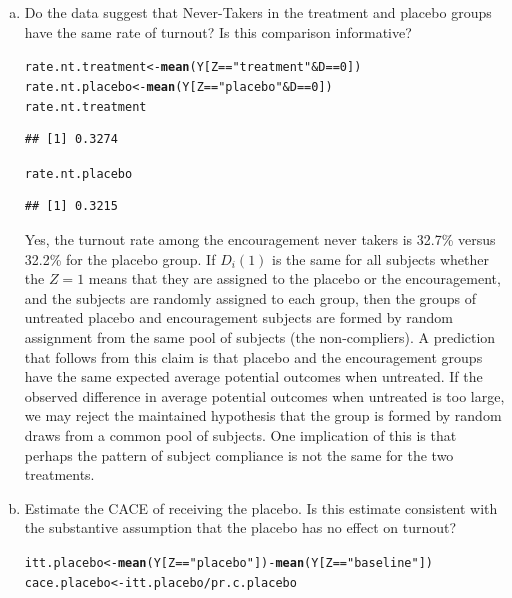 \documentclass[11pt,notitlepage]{article}\usepackage[]{graphicx}\usepackage[]{color}
\makeatletter
\newcommand{\hlnum}[1]{\textcolor[rgb]{0.686,0.059,0.569}{#1}}%
\newcommand{\hlstr}[1]{\textcolor[rgb]{0.192,0.494,0.8}{#1}}%
\newcommand{\hlopt}[1]{\textcolor[rgb]{0,0,0}{#1}}%
\newcommand{\hlstd}[1]{\textcolor[rgb]{0.345,0.345,0.345}{#1}}%
\newcommand{\hlkwb}[1]{\textcolor[rgb]{0.69,0.353,0.396}{#1}}%
\newcommand{\hlkwd}[1]{\textcolor[rgb]{0.737,0.353,0.396}{\textbf{#1}}}%
\newenvironment{kframe}{%
 \def\at@end@of@kframe{}%
 \ifinner\ifhmode%
  \def\at@end@of@kframe{\end{minipage}}%
  \begin{minipage}{\columnwidth}%
 \fi\fi%
 \def\FrameCommand##1{\hskip\@totalleftmargin \hskip-\fboxsep
 \colorbox{shadecolor}{##1}\hskip-\fboxsep
     \hskip-\linewidth \hskip-\@totalleftmargin \hskip\columnwidth}%
 \MakeFramed {\advance\hsize-\width
   \@totalleftmargin\z@ \linewidth\hsize
   \@setminipage}}%
 {\par\unskip\endMakeFramed%
 \at@end@of@kframe}
\newenvironment{knitrout}{}{} %
\makeatother
\begin{document}
\begin{enumerate}[a)]
\item Do the data suggest that Never-Takers in the treatment and placebo groups have the same rate of turnout? Is this comparison informative?\\
\begin{knitrout}
\color{fgcolor}\begin{kframe}
\begin{alltt}
\hlstd{rate.nt.treatment} \hlkwb{<-} \hlkwd{mean}\hlstd{(Y[Z}\hlopt{==}\hlstr{"treatment"} \hlopt{&} \hlstd{D}\hlopt{==}\hlnum{0}\hlstd{])}
\hlstd{rate.nt.placebo} \hlkwb{<-} \hlkwd{mean}\hlstd{(Y[Z}\hlopt{==}\hlstr{"placebo"} \hlopt{&} \hlstd{D}\hlopt{==}\hlnum{0}\hlstd{])}
\hlstd{rate.nt.treatment}
\end{alltt}
\begin{verbatim}
## [1] 0.3274
\end{verbatim}
\begin{alltt}
\hlstd{rate.nt.placebo}
\end{alltt}
\begin{verbatim}
## [1] 0.3215
\end{verbatim}
\end{kframe}
\end{knitrout}
Yes, the turnout rate among the encouragement never takers is 32.7\% versus 32.2\% for the placebo group. If $D_i(1)$ is the same for all subjects whether the $Z=1$ means that they are assigned to the placebo or the encouragement, and the subjects are randomly assigned to each group, then the groups of untreated placebo and encouragement subjects are formed by random assignment from the same pool of subjects (the non-compliers). A prediction that follows from this claim is that placebo and the encouragement groups have the same expected average potential outcomes when untreated. If the observed difference in average potential outcomes when untreated is too large, we may reject the maintained hypothesis that the group is formed by random draws from a common pool of subjects. One implication of this is that perhaps the pattern of subject compliance is not the same for the two treatments.

\item Estimate the CACE of receiving the placebo. Is this estimate consistent with the substantive assumption that the placebo has no effect on turnout?\\
\begin{knitrout}
\color{fgcolor}\begin{kframe}
\begin{alltt}
\hlstd{itt.placebo} \hlkwb{<-} \hlkwd{mean}\hlstd{(Y[Z}\hlopt{==}\hlstr{"placebo"}\hlstd{])} \hlopt{-} \hlkwd{mean}\hlstd{(Y[Z}\hlopt{==}\hlstr{"baseline"}\hlstd{])}
\hlstd{cace.placebo} \hlkwb{<-} \hlstd{itt.placebo}\hlopt{/}\hlstd{pr.c.placebo}
\end{alltt}
\end{kframe}
\end{knitrout}


\end{enumerate}
\end{document}
